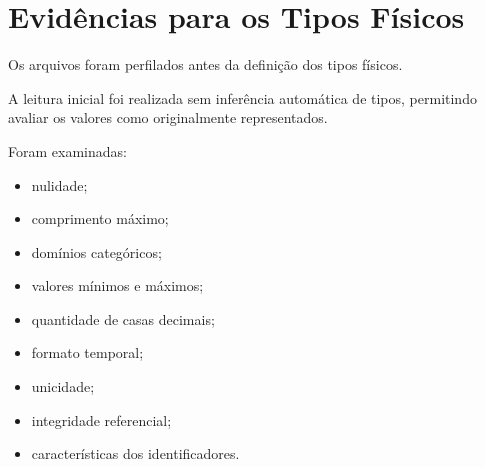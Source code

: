 \documentclass[12pt,a4paper]{article}
\begin{document}
	\section{Evidências para os Tipos Físicos}
	
	Os arquivos foram perfilados antes da definição dos tipos físicos.
	
	A leitura inicial foi realizada sem inferência automática de tipos,
	permitindo avaliar os valores como originalmente representados.
	
	Foram examinadas:
	
	\begin{itemize}[leftmargin=1.2cm]
		\item nulidade;
		\item comprimento máximo;
		\item domínios categóricos;
		\item valores mínimos e máximos;
		\item quantidade de casas decimais;
		\item formato temporal;
		\item unicidade;
		\item integridade referencial;
		\item características dos identificadores.
	\end{itemize}
	
\end{document}
